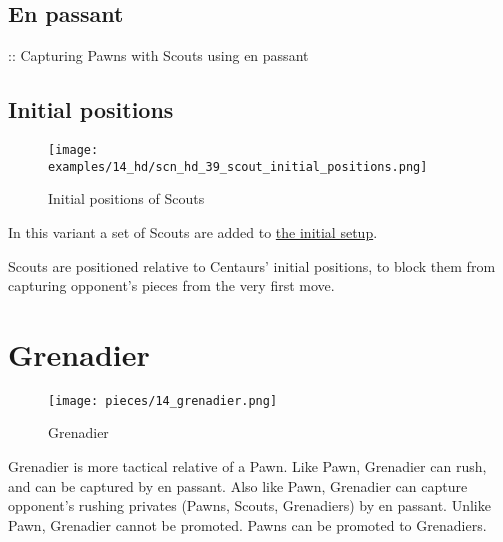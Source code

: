 \subsection*{En passant}
\label{sec:Hemera's Dawn/Scout/En passant}

\TODO :: Capturing Pawns with Scouts using en passant

\clearpage %

\subsection*{Initial positions}
\label{sec:Hemera's Dawn/Scout/Initial positions}

\vspace*{-1.2\baselineskip}
\noindent
\begin{figure}[!h]
\texttt{[image: examples/14\_hd/scn\_hd\_39\_scout\_initial\_positions.png]}
\vspace*{-1.3\baselineskip}
\caption{Initial positions of Scouts}
\label{fig:scn_hd_39_scout_initial_positions}
\end{figure}

\vspace*{-0.5\baselineskip}
In this variant a set of Scouts are added to
\hyperref[fig:14_hemera_s_dawn]{the initial setup}.

Scouts are positioned relative to Centaurs' initial positions, to block them
from capturing opponent's pieces from the very first move.

\clearpage %

\section*{Grenadier}
\label{sec:Hemera's Dawn/Grenadier}

\vspace*{-0.7\baselineskip}
\noindent
\begin{wrapfigure}[10]{l}{0.4\textwidth}
\centering
\texttt{[image: pieces/14\_grenadier.png]}
\vspace*{-1.3\baselineskip}
\caption{Grenadier}
\label{fig:14_grenadier}
\end{wrapfigure}
Grenadier is more tactical relative of a Pawn. Like Pawn, Grenadier can rush, and
can be captured by en passant. Also like Pawn, Grenadier can capture opponent's
rushing privates (Pawns, Scouts, Grenadiers) by en passant. Unlike Pawn, Grenadier
cannot be promoted. Pawns can be promoted to Grenadiers.

